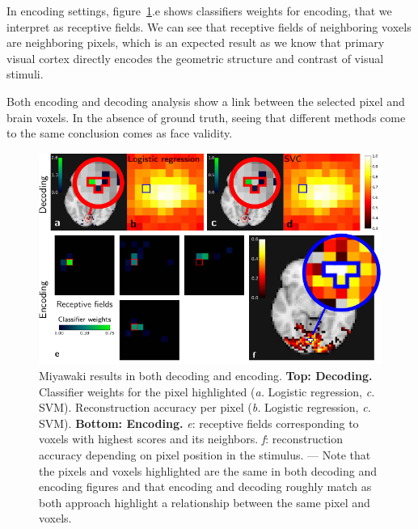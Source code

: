 \documentclass{frontiersSCNS} %
\begin{document}
In encoding settings, figure~\ref{fig:miyawaki}.e shows classifiers
weights for encoding, that we interpret as receptive fields. We can
see that receptive fields of neighboring voxels are neighboring
pixels, which is an expected result as we know that primary visual
cortex directly encodes the geometric structure and contrast of visual
stimuli.

Both encoding and decoding analysis show a link between the selected
pixel and brain voxels. In the absence of ground truth, seeing that
different methods come to the same conclusion comes as face validity.


\begin{figure}[hbtp]
  \begin{center}
    \includegraphics[width=\linewidth]{scripts/miyawaki/figure}
  \end{center}
  \caption{
      Miyawaki results in both decoding and encoding.
      \textbf{Top: Decoding.} Classifier weights for the pixel
      highlighted (\textit{a.} Logistic regression, \textit{c.} SVM).
      Reconstruction accuracy per pixel
      (\textit{b.} Logistic
      regression, \textit{c.} SVM). 
      \textbf{Bottom: Encoding.} \textit{e}: receptive fields corresponding to
       voxels with highest scores and its neighbors.
       \textit{f}: reconstruction accuracy depending on 
	  pixel position in the stimulus. --- Note that the pixels and voxels highlighted are the same in 
      both decoding and encoding figures and that encoding and decoding
      roughly match as both approach highlight a relationship between the
      same pixel and voxels.
}
\label{fig:miyawaki}
\end{figure}
\end{document}
